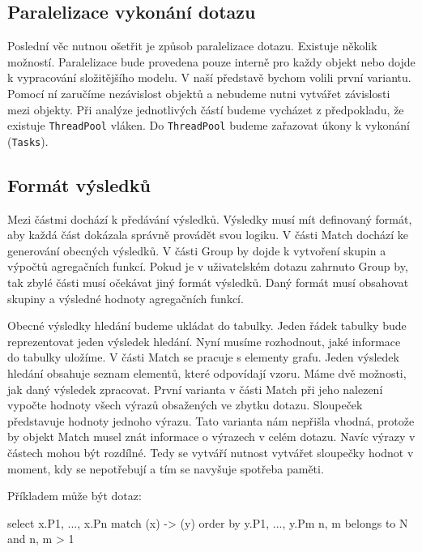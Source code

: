 \subsection{Paralelizace vykonání dotazu}

Poslední věc nutnou ošetřit je způsob paralelizace dotazu.
Existuje několik možností.
Paralelizace bude provedena pouze interně pro každy objekt nebo dojde k vypracování složitějšího modelu.
V naší představě bychom volili první variantu.
Pomocí ní zaručíme nezávislost objektů a nebudeme nutni vytvářet závislosti mezi objekty.
Při analýze jednotlivých částí budeme vycházet z předpokladu, že existuje \texttt{ThreadPool} vláken.
Do \texttt{ThreadPool} budeme zařazovat úkony k vykonání (\texttt{Tasks}).

\subsection{Formát výsledků} \label{anal.tables}

Mezi částmi dochází k předávání výsledků.
Výsledky musí mít definovaný formát, aby každá část dokázala správně provádět svou logiku.
V části Match dochází ke generování obecných výsledků.
V části Group by dojde k vytvoření skupin a výpočtů agregačních funkcí.
Pokud je v uživatelském dotazu zahrnuto Group by, tak zbylé části musí očekávat jiný formát výsledků.
Daný formát musí obsahovat skupiny a výsledné hodnoty agregačních funkcí.

Obecné výsledky hledání budeme ukládat do tabulky.
Jeden řádek tabulky bude reprezentovat jeden výsledek hledání.
Nyní musíme rozhodnout, jaké informace do tabulky uložíme.
V části Match se pracuje s elementy grafu.
Jeden výsledek hledání obsahuje seznam elementů, které odpovídají vzoru.
Máme dvě možnosti, jak daný výsledek zpracovat.
První varianta v části Match při jeho nalezení vypočte hodnoty všech výrazů obsažených ve zbytku dotazu.
Sloupeček představuje hodnoty jednoho výrazu.
Tato varianta nám nepřišla vhodná, protože by objekt Match musel znát informace o výrazech v celém dotazu.
Navíc výrazy v částech mohou být rozdílné.
Tedy se vytváří nutnost vytvářet sloupečky hodnot v moment, kdy se nepotřebují a tím se navyšuje spotřeba paměti.

\clearpage

Příkladem může být dotaz: 
\begin{code}
select x.P1, ..., x.Pn match (x) -> (y) order by y.P1, ..., y.Pm  
n, m belongs to N and n, m > 1
\end{code}

